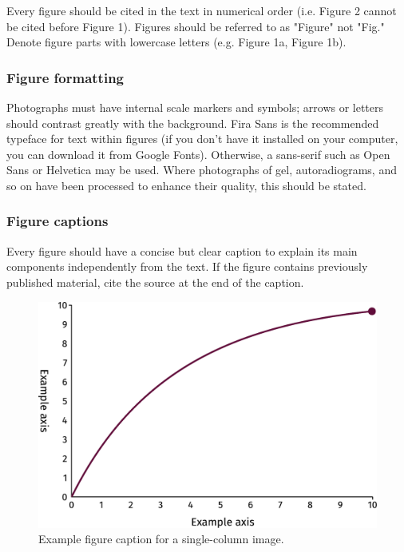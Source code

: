 \documentclass[twocolumn]{sintr}
\begin{document}
Every figure should be cited in the text in numerical order (i.e. Figure 2 cannot be cited before Figure 1). Figures should be referred to as "Figure" not "Fig." Denote figure parts with lowercase letters (e.g. Figure 1a, Figure 1b).

\subsubsection{Figure formatting}

Photographs must have internal scale markers and symbols; arrows or letters should contrast greatly with the background. Fira Sans is the recommended typeface for text within figures (if you don’t have it installed on your computer, you can download it from Google Fonts). Otherwise, a sans-serif such as Open Sans or Helvetica may be used. Where photographs of gel, autoradiograms, and so on have been processed to enhance their quality, this should be stated.


\lipsum[1]

\subsubsection{Figure captions}

Every figure should have a concise but clear caption to explain its main components independently from the text. If the figure contains previously published material, cite the source at the end of the caption.

\begin{figure}[!b]
	\centering
	\includegraphics[width=\linewidth]{Figure1.pdf}
	\caption{Example figure caption for a single-column image.}
	\label{fig:1}
\end{figure}
\end{document}
